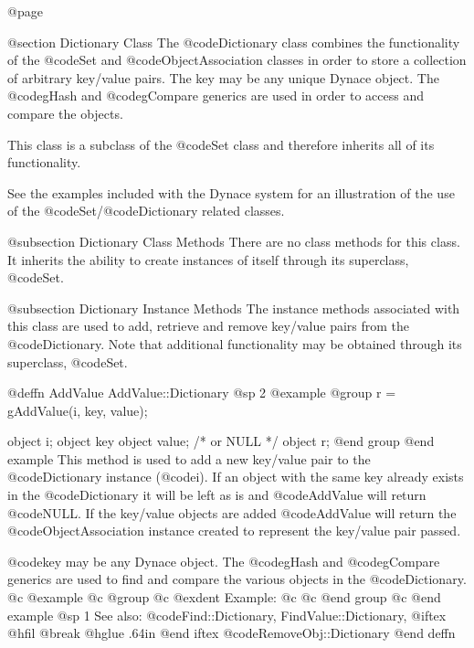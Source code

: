 @page

@section Dictionary Class
The @code{Dictionary} class combines the functionality of the @code{Set}
and @code{ObjectAssociation} classes in order to store a collection of
arbitrary key/value pairs.  The key may be any unique Dynace object.
The @code{gHash} and @code{gCompare} generics are used in order to
access and compare the objects.

This class is a subclass of the @code{Set} class and therefore inherits
all of its functionality.

See the examples included with the Dynace system for an illustration of the
use of the @code{Set}/@code{Dictionary} related classes.


@subsection Dictionary Class Methods
There are no class methods for this class.  It inherits the ability
to create instances of itself through its superclass, @code{Set}.



@subsection Dictionary Instance Methods
The instance methods associated with this class are used to add, retrieve
and remove key/value pairs from the @code{Dictionary}.  Note that additional
functionality may be obtained through its superclass, @code{Set}.






@deffn {AddValue} AddValue::Dictionary
@sp 2
@example
@group
r = gAddValue(i, key, value);

object  i;
object  key
object  value;    /*  or NULL   */
object  r;
@end group
@end example
This method is used to add a new key/value pair to the @code{Dictionary}
instance (@code{i}).  If an object with the same key already exists in
the @code{Dictionary} it will be left as is and @code{AddValue} will return
@code{NULL}.  If the key/value objects are added @code{AddValue} will
return the @code{ObjectAssociation} instance created to represent the
key/value pair passed.

@code{key} may be any Dynace object.  The @code{gHash} and
@code{gCompare} generics are used to find and compare the various
objects in the @code{Dictionary}.
@c @example
@c @group
@c @exdent Example:
@c 
@c @end group
@c @end example
@sp 1
See also:  @code{Find::Dictionary, FindValue::Dictionary,}
@iftex
@hfil @break @hglue .64in      
@end iftex
@code{RemoveObj::Dictionary}
@end deffn










